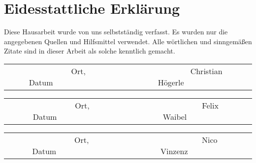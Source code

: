 \section*{Eidesstattliche Erklärung}
Diese Hausarbeit wurde von uns selbstständig verfasst. Es wurden nur die angegebenen Quellen und Hilfsmittel verwendet. Alle wörtlichen und sinngemäßen Zitate sind in dieser Arbeit als solche kenntlich gemacht.\\

\vspace{3cm}
\begin{tabular*}{\textwidth}{c@{\extracolsep\fill}cc}
	\cline{1-1}
	\cline{3-3}
	\\
	\ \ \ \ \ \ \ \ \ Ort, Datum\ \ \ \ \ \ \ \ \ \ & & \ \ \ \ \ \ \ \ \ Christian Högerle\ \ \ \ \ \ \ \ \ \\
\end{tabular*}

\vspace{3cm}
\begin{tabular*}{\textwidth}{c@{\extracolsep\fill}cc}
	\cline{1-1}
	\cline{3-3}
	\\
	\ \ \ \ \ \ \ \ \ Ort, Datum\ \ \ \ \ \ \ \ \ \ & & \ \ \ \ \ \ \ \ \ Felix Waibel\ \ \ \ \ \ \ \ \ \\
\end{tabular*}

\vspace{3cm}
\begin{tabular*}{\textwidth}{c@{\extracolsep\fill}cc}
	\cline{1-1}
	\cline{3-3}
	\\
	\ \ \ \ \ \ \ \ \ Ort, Datum\ \ \ \ \ \ \ \ \ \ & & \ \ \ \ \ \ \ \ \ Nico Vinzenz\ \ \ \ \ \ \ \ \ \\
\end{tabular*}